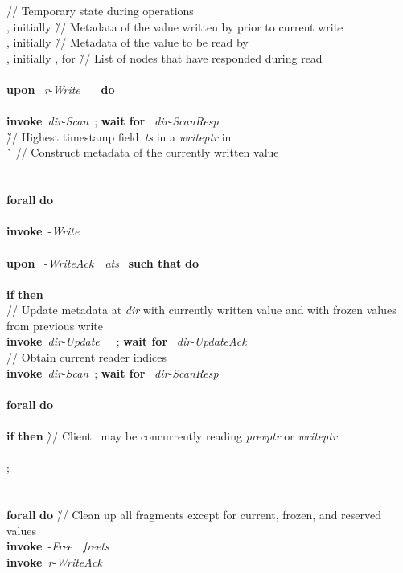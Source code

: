 \documentclass[oribibl]{llncs}
\theoremstyle{definition-boldhead}
\newcommand{\var}[1]{\textit{#1}}
\newcommand{\newe}{{\bf invoke}\xspace}
\newcommand{\event}[2]{~{\var{#1}}-\textsl{#2}~}
\newcommand{\eventt}[3]{~{\var{#1}}-\textsl{#2}~~{#3}~}
\newcommand{\dir}{\var{dir}\xspace}
\newcommand{\NAME}{AWE\xspace}
\newcommand{\nodes}{nodes\xspace}
\begin{document}
\begin{alg}
\begin{tabbing}
  \> // Temporary state during operations \\
  \> , initially 
     \` // Metadata of the value written by  prior to current write \\
  \> , initially 
     \` // Metadata of the value to be read by  \\
  \> , initially , for 
     \` // List of \nodes that have responded during read \\
  \\
  \textbf{upon} \eventt{r}{Write}{} \textbf{do} \\
  \>  \\
\> \newe \event{dir}{Scan};
     \textbf{wait for} \eventt{dir}{ScanResp}{} \\
  \> 
     \` // Highest timestamp field~\var{ts} in a \var{writeptr} in  \\
  \> 
     \` \> // Construct metadata of the currently written value \\
  \>  \\
  \>  \\
  \> \textbf{forall}  \textbf{do} \\
  \> \>  \\
  \> \> \newe \eventt{}{Write}{} \\
  \\
  \textbf{upon} \eventt{}{WriteAck}{\var{ats}} \textbf{such that}
  	 \textbf{do} \\
  \>  \\
  \> \textbf{if}  \textbf{then} \\
\> \> // Update metadata at \dir with currently written value
           and with frozen values from previous write \\
  \> \> \newe \eventt{dir}{Update}{};
        \textbf{wait for} \event{dir}{UpdateAck} \\
\> \> // Obtain current reader indices \\
  \> \> \newe \event{dir}{Scan};
        \textbf{wait for} \eventt{dir}{ScanResp}{} \\
  \> \>  \\
  \> \> \textbf{forall}  \textbf{do} \\
  \> \> \>  \\
  \> \> \> \textbf{if}  \textbf{then}
           \` // Client~ may be concurrently reading \var{prevptr}
                 or \var{writeptr} \\
  \> \> \> \>  \\
  \> \> \> \> ;
               \\
  \> \> \> \>  \\
  \> \>  \\
  \> \> \textbf{forall}  \textbf{do}
        \` // Clean up all fragments except for current, frozen, and reserved values \\
  \> \> \> \newe \eventt{}{Free}{\var{freets}}\\
\> \> \newe \event{r}{WriteAck}
\end{tabbing}
\caption{Protocol~\NAME, atomic register instance~\var{r}
  for client~ (part~1).}
\label{alg:client-1}
\end{alg}
\end{document}

